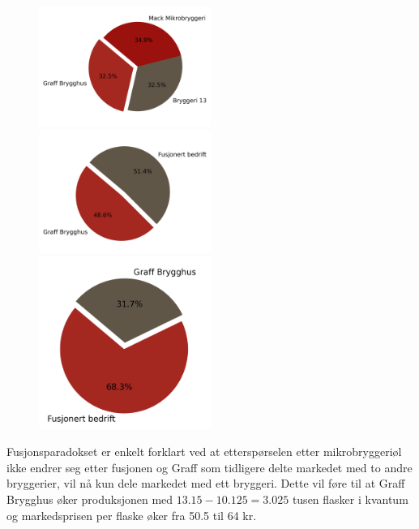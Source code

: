 \documentclass[
  12pt,
  a4paper,
  DIV=11,
  numbers=noendperiod]{scrartcl}
\begin{document}
\begin{figure}
  \centering
  \includegraphics[width=0.5\textwidth]{dokumentobjekter/figurer/cournot_mikrobryggerier.png}
  \label{fig:cournot_før_fusjon}
  \includegraphics[width=0.5\textwidth]{dokumentobjekter/figurer/fusjonert_bedrift.png}
  \label{fig:cournot_etter_fusjon}
  \includegraphics[width=0.5\textwidth]{dokumentobjekter/figurer/stackelberg_mack_graff.png}
  \label{fig:stackelberg_etter_fusjon}
  \vspace{-2.5cm}
\end{figure}

Fusjonsparadokset er enkelt forklart ved at etterspørselen etter
mikrobryggeriøl ikke endrer seg etter fusjonen og Graff som tidligere
delte markedet med to andre bryggerier, vil nå kun dele markedet med ett
bryggeri. Dette vil føre til at Graff Brygghus øker produksjonen med
\(13.15 - 10.125 =  3.025\) tusen flasker i kvantum og markedsprisen per
flaske øker fra 50.5 til 64 kr.
\end{document}
